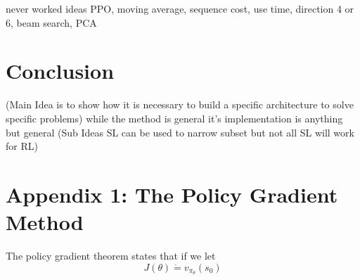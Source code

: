 \documentclass[12pt]{article}
\begin{document}





never worked ideas PPO, moving average, sequence cost, use time, direction 4 or 6, beam search, PCA

\section{Conclusion}
(Main Idea is to show how it is necessary to build a specific architecture to solve specific problems)
    while the method is general it's implementation is anything but general
(Sub Ideas SL can be used to narrow subset but not all SL will work for RL)

\section*{Appendix 1: The Policy Gradient Method}

The policy gradient theorem states that if we let
\begin{equation*}
  J(\theta)\dot{=}v_{\pi_{\theta}}(s_0)
\end{equation*}
\end{document}
